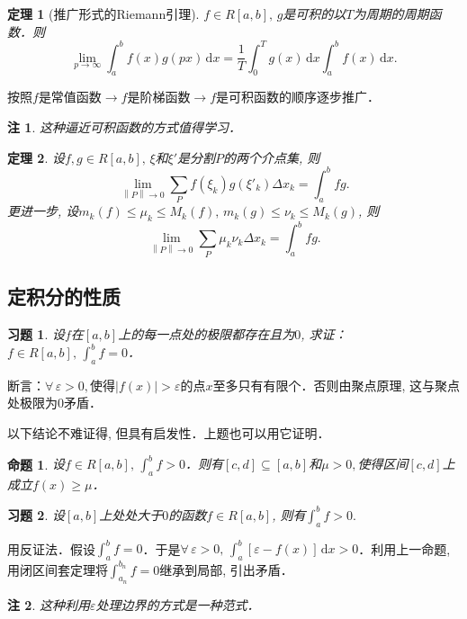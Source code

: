 \documentclass[11pt,a4paper]{ctexart}
\makeatletter
\theoremstyle{thmseries} %
\newtheorem{thm}{定理}[section]
\newtheorem{prop}{命题}[section]
\theoremstyle{exerseries}
\newtheorem{exer}{习题}[section]
\newtheorem*{rem}{注}
\renewenvironment{proof}[1][\proofname]{\par
  \pushQED{\qed}%
  \normalfont \topsep6\p@\@plus6\p@\relax
  \trivlist
  \item[\hskip\labelsep
        \itshape
    #1\@addpunct{}]\ignorespaces
}{%
  \popQED\endtrivlist\@endpefalse
}
\newenvironment{pf}{\begin{proof}[\bfseries\upshape 证\quad]}{\end{proof}}
\renewcommand{\epsilon}{\varepsilon}
\renewcommand{\d}{\mathrm{d}}
\newcommand{\norm}[1]{\left\lVert #1 \right\rVert}
\makeatother
\begin{document}
\begin{thm}[推广形式的Riemann引理]
	$f\in R[a,b],\,g$是可积的以$T$为周期的周期函数．则
	\[\lim_{p\to\infty}\int_{a}^{b}f(x)g(px)\,\d x=\frac{1}{T}\int_{0}^{T}g(x)\,\d x\int_{a}^{b}f(x)\,\d x.\]
\end{thm}
\begin{pf}
	按照$f$是常值函数$\to f$是阶梯函数$\to f$是可积函数的顺序逐步推广．
\end{pf}
\begin{rem}
	这种逼近可积函数的方式值得学习．
\end{rem}

\begin{thm}
	设$f,g\in R[a,b],\,\xi$和$\xi'$是分割$P$的两个介点集, 则
	\[\lim_{\norm{P}\to0}\sum_{P}f(\xi_k)g(\xi'_k)\Delta x_k=\int_{a}^{b}fg.\]
	更进一步, 设$m_k(f)\leq\mu_k\leq M_k(f),\,m_k(g)\leq\nu_k\leq M_k(g)$, 则
	\[\lim_{\norm{P}\to0}\sum_{P}\mu_k\nu_k\Delta x_k=\int_{a}^{b}fg.\]
\end{thm}


\subsection{定积分的性质}
\begin{exer}
	设$f$在$[a,b]$上的每一点处的极限都存在且为$0$, 求证：$f\in R[a,b],\,\int_{a}^{b}f=0$．
\end{exer}
\begin{pf}
	断言：$\forall\,\epsilon>0,$使得$|f(x)|>\epsilon$的点$x$至多只有有限个．否则由聚点原理, 这与聚点处极限为0矛盾．
\end{pf}

以下结论不难证得, 但具有启发性．上题也可以用它证明．
\begin{prop}
	设$f\in R[a,b],\,\int_{a}^{b}f>0$．则有$[c,d]\subseteq[a,b]$和$\mu>0,$使得区间$[c,d]$上成立$f(x)\geq\mu$．
\end{prop}

\begin{exer}
	设$[a,b]$上处处大于$0$的函数$f\in R[a,b]$, 则有$\int_{a}^{b}f>0.$
\end{exer}
\begin{pf}
	用反证法．假设$\int_{a}^{b}f=0$．于是$\forall\,\epsilon>0,\,\int_{a}^{b}[\epsilon-f(x)]\,\d x>0$．利用上一命题, 用闭区间套定理将$\int_{a_n}^{b_n}f=0$继承到局部, 引出矛盾．
\end{pf}
\begin{rem}
	这种利用$\epsilon$处理边界的方式是一种范式．
\end{rem}
\end{document}
